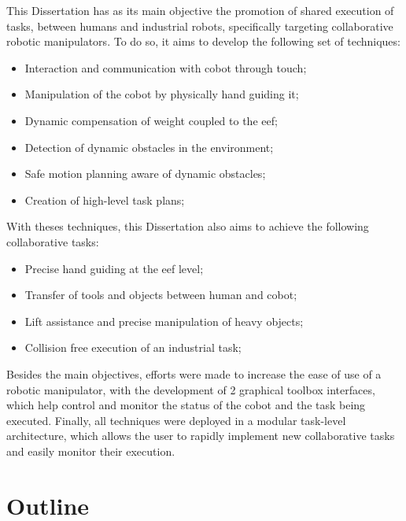 \par This Dissertation has as its main objective the promotion of shared execution of tasks, between humans and industrial robots, specifically targeting collaborative robotic manipulators. To do so, it aims to develop the following set of techniques:

\begin{itemize}
    \item Interaction and communication with cobot through touch;
    \item Manipulation of the cobot by physically hand guiding it;
    \item Dynamic compensation of weight coupled to the \ac{eef};
    \item Detection of dynamic obstacles in the environment;
    \item Safe motion planning aware of dynamic obstacles;
    \item Creation of high-level task plans;
\end{itemize}

\par With theses techniques, this Dissertation also aims to achieve the following collaborative tasks:

\begin{itemize}
    \item Precise hand guiding at the \ac{eef} level;
    \item Transfer of tools and objects between human and cobot;
    \item Lift assistance and precise manipulation of heavy objects;
    \item Collision free execution of an industrial task;
\end{itemize}

\par Besides the main objectives, efforts were made to increase the ease of use of a robotic manipulator, with the development of 2 graphical toolbox interfaces, which help control and monitor the status of the cobot and the task being executed. Finally, all techniques were deployed in a modular task-level architecture, which allows the user to rapidly implement new collaborative tasks and easily monitor their execution.

\section{Outline}


